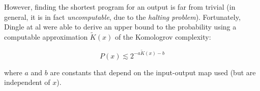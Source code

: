 However, finding the shortest program for an output is far from trivial (in general, it is in fact \emph{uncomputable}, due to the \emph{halting problem}). Fortunately, Dingle at al \cite{dingle2018input} were able to derive an upper bound to the probability using a computable approximation \(\widetilde{K}(x)\) of the Komologrov complexity:

\[
  P(x) \lesssim 2^{-a\widetilde{K}(x) -b}
\]

where \(a\) and \(b\) are constants that depend on the input-output map used (but are independent of \(x\)).


